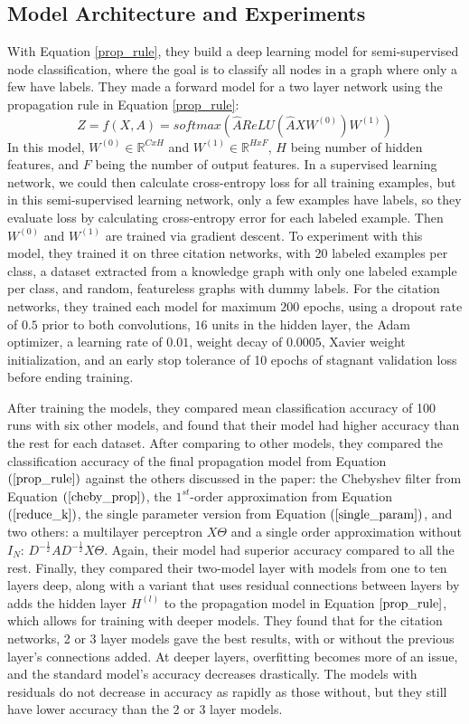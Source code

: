 \subsection{Model Architecture and Experiments}
With Equation \ref{prop_rule}, they build a deep learning model for semi-supervised node classification, where the goal is to classify all nodes in a graph where only a few have labels. They made a forward model for a two layer network using the propagation rule in Equation \ref{prop_rule}:
\begin{equation}
\label{forward_model}
Z = f(X, A) = softmax(\hat{A} ReLU(\hat{A}XW^{(0)})W^{(1)})
\end{equation}
In this model, $W^{(0)} \in \mathbb{R}^{C x H}$ and $W^{(1)} \in \mathbb{R}^{H x F}$, $H$ being number of hidden features, and $F$ being the number of output features.
In a supervised learning network, we could then calculate cross-entropy loss for all training examples, but in this semi-supervised learning network, only a few examples have labels, so they evaluate loss by calculating cross-entropy error for each labeled example. Then $W^{(0)}$ and $W^{(1)}$ are trained via gradient descent.
To experiment with this model, they trained it on three citation networks, with 20 labeled examples per class, a dataset extracted from a knowledge graph with only one labeled example per class, and random, featureless graphs with dummy labels. For the citation networks, they trained each model for maximum $200$ epochs, using a dropout rate of $0.5$ prior to both convolutions, $16$ units in the hidden layer, the Adam optimizer, a learning rate of $0.01$, weight decay of $0.0005$, Xavier weight initialization, and an early stop tolerance of 10 epochs of stagnant validation loss before ending training. 

After training the models, they compared mean classification accuracy of 100 runs with six other models, and found that their model had higher accuracy than the rest for each dataset. After comparing to other models, they compared the classification accuracy of the final propagation model from Equation $(\ref{prop_rule})$ against the others discussed in the paper: the Chebyshev filter from Equation $(\ref{cheby_prop})$, the $1^{st}$-order approximation from Equation $(\ref{reduce_k})$, the single parameter version from Equation $(\ref{single_param})$, and two others: a multilayer perceptron $X\Theta$ and a single order approximation without $I_N$: 
$D^{-\frac{1}{2}}AD^{-\frac{1}{2}}X\Theta $. Again, their model had superior accuracy compared to all the rest.
Finally, they compared their two-model layer with models from one to ten layers deep, along with a variant that uses residual connections between layers by adds the hidden layer $H^{(l)}$ to the propagation model in Equation $\ref{prop_rule}$, which allows for training with deeper models. They found that for the citation networks, 2 or 3 layer models gave the best results, with or without the previous layer's connections added. At deeper layers, overfitting becomes more of an issue, and the standard model's accuracy decreases drastically. The models with residuals do not decrease in accuracy as rapidly as those without, but they still have lower accuracy than the 2 or 3 layer models. 